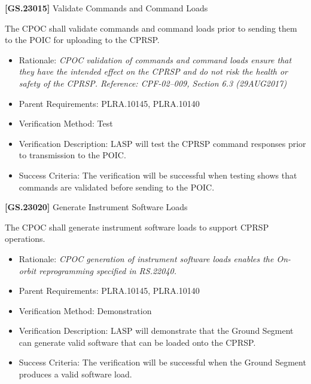 \textbf{[GS.23015]} Validate Commands and Command Loads

The \gls{CPOC} shall validate commands and command loads prior to sending them to the \gls{POIC} for uploading to the \gls{CPRSP}.

\begin{itemize}
\item{} Rationale: \emph{CPOC validation of commands and command loads ensure that they have the intended effect on the CPRSP and do not risk the health or safety of the CPRSP. Reference: CPF-02--009, Section 6.3 (29AUG2017)}

\item{} Parent Requirements: PLRA.10145, PLRA.10140

\item{} Verification Method: Test

\item{} Verification Description: \gls{LASP} will \gls{test} the \gls{CPRSP} command responses prior to transmission to the \gls{POIC}.

\item{} Success Criteria: The verification will be successful when \gls{test}ing shows that commands are validated before sending to the \gls{POIC}.

\end{itemize}

\textbf{[GS.23020]} Generate Instrument Software Loads

The \gls{CPOC} shall generate instrument software loads to support \gls{CPRSP} operations.

\begin{itemize}
\item{} Rationale: \emph{CPOC generation of instrument software loads enables the On-orbit reprogramming specified in RS.22040.}

\item{} Parent Requirements: PLRA.10145, PLRA.10140

\item{} Verification Method: Demonstration

\item{} Verification Description: \gls{LASP} will demonstrate that the Ground Segment can generate valid software that can be loaded onto the \gls{CPRSP}.

\item{} Success Criteria: The verification will be successful when the Ground Segment produces a valid software load.

\end{itemize}

